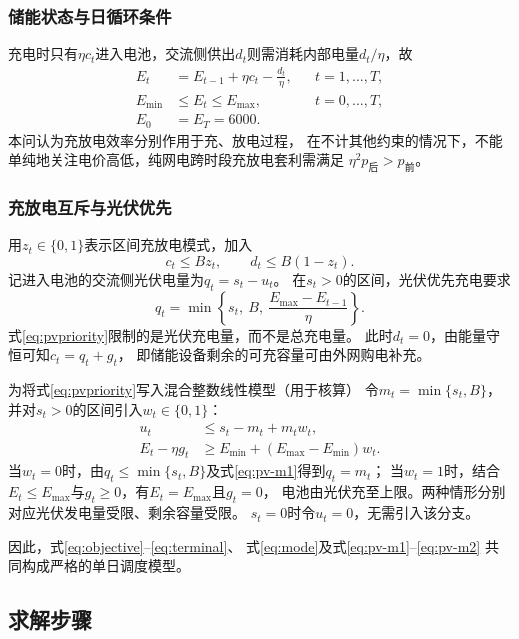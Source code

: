 \documentclass[UTF8,a4paper,12pt]{ctexart}
\begin{document}
\subsubsection{储能状态与日循环条件}
充电时只有$\eta c_t$进入电池，交流侧供出$d_t$则需消耗内部电量$d_t/\eta$，故
\begin{align}
  E_t&=E_{t-1}+\eta c_t-\frac{d_t}{\eta},
       &&t=1,\ldots,T, \label{eq:state}\\
  E_{\min}&\le E_t\le E_{\max},
       &&t=0,\ldots,T, \label{eq:soc}\\
  E_0&=E_T=6000. && \label{eq:terminal}
\end{align}
本问认为充放电效率分别作用于充、放电过程，
在不计其他约束的情况下，不能单纯地关注电价高低，纯网电跨时段充放电套利需满足
$\eta^2p_{\text{后}}>p_{\text{前}}$。

\subsubsection{充放电互斥与光伏优先}
用$z_t\in\{0,1\}$表示区间充放电模式，加入
\begin{equation}
  c_t\le Bz_t,\qquad d_t\le B(1-z_t).
  \label{eq:mode}
\end{equation}
记进入电池的交流侧光伏电量为$q_t=s_t-u_t$。
在$s_t>0$的区间，光伏优先充电要求
\begin{equation}
  q_t=\min\left\{s_t,\ B,\ \frac{E_{\max}-E_{t-1}}{\eta}\right\}.
  \label{eq:pvpriority}
\end{equation}
式\eqref{eq:pvpriority}限制的是光伏充电量，而不是总充电量。
此时$d_t=0$，由能量守恒可知$c_t=q_t+g_t$，
即储能设备剩余的可充容量可由外网购电补充。

为将式\eqref{eq:pvpriority}写入混合整数线性模型（用于核算）
令$m_t=\min\{s_t,B\}$，并对$s_t>0$的区间引入$w_t\in\{0,1\}$：
\begin{align}
  u_t&\le s_t-m_t+m_tw_t, \label{eq:pv-m1}\\
  E_t-\eta g_t&\ge E_{\min}+(E_{\max}-E_{\min})w_t.
  \label{eq:pv-m2}
\end{align}
当$w_t=0$时，由$q_t\le\min\{s_t,B\}$及式\eqref{eq:pv-m1}得到$q_t=m_t$；
当$w_t=1$时，结合$E_t\le E_{\max}$与$g_t\ge0$，有$E_t=E_{\max}$且$g_t=0$，
电池由光伏充至上限。两种情形分别对应光伏发电量受限、剩余容量受限。
$s_t=0$时令$u_t=0$，无需引入该分支。

因此，式\eqref{eq:objective}--\eqref{eq:terminal}、
式\eqref{eq:mode}及式\eqref{eq:pv-m1}--\eqref{eq:pv-m2}
共同构成严格的单日调度模型。

\subsection{求解步骤}
\end{document}
